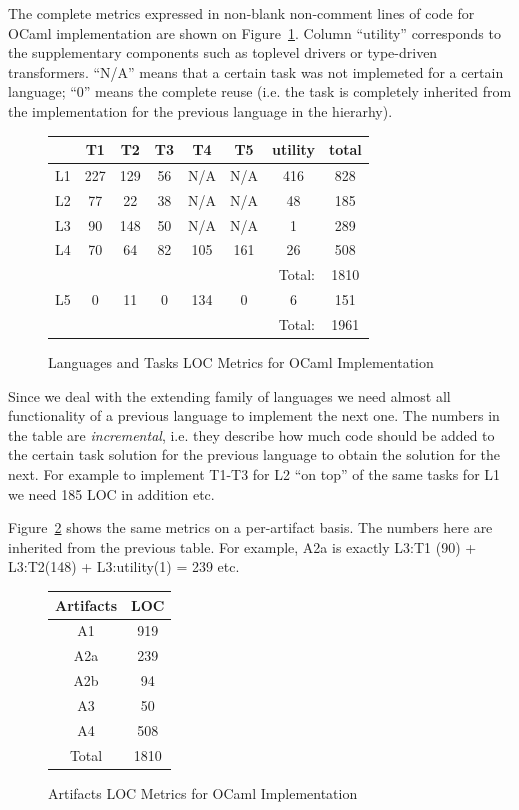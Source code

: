 The complete metrics expressed in non-blank non-comment lines of code for OCaml implementation are 
shown on Figure~\ref{OCamlmap}. Column ``utility'' corresponds to the supplementary components 
such as toplevel drivers or type-driven transformers. ``N/A'' means that a certain task was not implemeted 
for a certain language; ``0'' means the complete reuse (i.e. the task is completely inherited from the 
implementation for the previous language in the hierarhy).

\begin{figure}
\centering
\begin{tabular}{|c||c|c|c|c|c|c||c|}
\hline
 & T1 & T2 & T3 & T4 & T5 & utility & total \\
\hline
\hline
L1 & 227 & 129 & 56 & N/A & N/A & 416 & 828 \\
L2 & 77 & 22 & 38 & N/A & N/A & 48 & 185 \\
L3 & 90 & 148 & 50 & N/A & N/A & 1 & 289 \\
L4 & 70 & 64 & 82 & 105 & 161 & 26 & 508 \\
\hline
\multicolumn{7}{|r||}{Total:} & 1810 \\
\hline
L5 & 0 & 11 & 0 & 134 & 0 & 6 & 151 \\
\hline
\multicolumn{7}{|r||}{Total:} & 1961 \\
\hline
\end{tabular}
\caption{Languages and Tasks LOC Metrics for OCaml Implementation}
\label{OCamlmap}
\end{figure}

Since we deal with the extending family of languages we need almost all functionality of a previous language 
to implement the next one. The numbers in the table are \emph{incremental}, i.e. they describe how much code 
should be added to the certain task solution for the previous language to obtain the solution for the next. 
For example to implement T1-T3 for L2 ``on top'' of the same tasks for L1 we need 185 LOC in addition etc.

Figure~\ref{OCamlarts} shows the same metrics on a per-artifact basis. The numbers here are inherited from
the previous table. For example, A2a is exactly L3:T1 (90) + L3:T2(148) + L3:utility(1) = 239 etc.

\begin{figure}
\centering
\begin{tabular}{|c||c|}
\hline
Artifacts & LOC \\
\hline
\hline
A1 & 919 \\
A2a & 239 \\
A2b & 94 \\
A3 & 50 \\
A4 & 508 \\
\hline
\hline
Total & 1810 \\
\hline
\end{tabular}
\caption{Artifacts LOC Metrics for OCaml Implementation}
\label{OCamlarts}
\end{figure}

